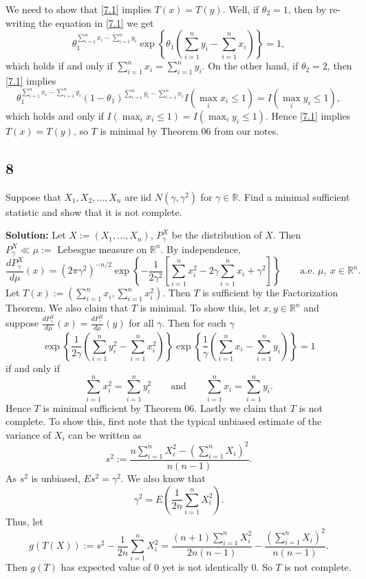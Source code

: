 \documentclass[12pt]{article}
\begin{document}
We need to show that \eqref{7.1} implies $T(x) = T(y)$. 
Well, if $\theta_2 = 1$, then by re-writing the equation in \eqref{7.1} we get 
\[
  \theta_{1}^{\sum_{i=1}^{n}x_{i} - \sum_{i=1}^{n}y_{i}}\exp\left\{ \theta_1\left(\sum_{i=1}^{n}y_{i} - \sum_{i=1}^{n}x_{i}\right) \right\} = 1,
\]
which holds if and only if $\sum_{i=1}^{n}x_{i} = \sum_{i=1}^{n}y_{i}$. 
On the other hand, if $\theta_2 = 2$, then \eqref{7.1} implies
\[ 
  \theta_{1}^{\sum_{i=1}^{n}x_{i} - \sum_{i=1}^{n}y_{i}}(1 - \theta_{1})^{\sum_{i=1}^{n}y_{i} - \sum_{i=1}^{n}x_{i}}I(\max_{i} x_{i} \leq 1) =
  I(\max_{i}y_{i} \leq 1),
\]
which holds and only if $I(\max_{i}x_{i} \leq 1) = I(\max_{i}y_{i} \leq 1)$. Hence \eqref{7.1} implies $T(x) = T(y)$, so $T$ is minimal by Theorem 06 from our notes.


\newpage
\subsection*{8}
\begin{tcolorbox}
  Suppose that $X_1,X_2,\ldots,X_n$ are iid $N(\gamma,\gamma^2)$ for $\gamma\in\mathbb{R}$.  Find a minimal sufficient statistic and show that it is not complete.
\end{tcolorbox}

{\bf Solution:}
Let $X := (X_{1}, \dots, X_{n})$, $P_{\gamma}^{X}$ be the distribution of $X$. Then $P_{\gamma}^{X} \ll \mu :=$ Lebesgue measure on $\mathbb{R}^n$.
By independence,
\[ 
  \frac{dP_{\gamma}^{X}}{d\mu}(x) = \left( 2\pi\gamma^{2} \right)^{-n/2}\exp\left\{ -\frac{1}{2\gamma^{2}}\left[ \sum_{i=1}^{n}x_{i}^{2} -
  2\gamma\sum_{i=1}^{n}x_{i} + \gamma^{2} \right] \right\} \qquad \text{a.e. } \mu, \ x \in \mathbb{R}^{n}.
\]
Let $T(x) := (\sum_{i=1}^{n}x_i, \sum_{i=1}^{n}x_{i}^{2})$. Then $T$ is sufficient by the Factorization Theorem. We also claim that $T$ is minimal.
To show this, let $x, y \in \mathbb{R}^{n}$ and suppose $\frac{dP_{\gamma}^{X}}{d\mu}(x) = \frac{dP_{\gamma}^{X}}{d\mu}(y)$ for all $\gamma$.
Then for each $\gamma$
\[
  \exp\left\{ \frac{1}{2\gamma}\left( \sum_{i=1}^{n}y_{i}^{2} - \sum_{i=1}^{n}x_{i}^{2} \right) \right\}\exp\left\{ \frac{1}{\gamma}\left( 
  \sum_{i=1}^{n}x_{i} - \sum_{i=1}^{n}y_{i}\right) \right\} = 1
\]
if and only if 
\[
  \sum_{i=1}^{n}x_{i}^{2} = \sum_{i=1}^{n}y_{i}^{2} \qquad \text{and} \qquad \sum_{i=1}^{n}x_{i} = \sum_{i=1}^{n}y_{i}.
\]
Hence $T$ is minimal sufficient by Theorem 06. Lastly we claim that $T$ is not complete. To show this, first note that the typical unbiased estimate
of the variance of $X_{i}$ can be written as
\[
  s^{2} := \frac{n\sum_{i=1}^{n}X_{i}^{2} - \left( \sum_{i=1}^{n}X_{i} \right)^{2}}{n(n-1)}.
\]
As $s^{2}$ is unbiased, $Es^{2} = \gamma^{2}$. We also know that 
\[
  \gamma^{2} = E\left( \frac{1}{2n}\sum_{i=1}^{n}X_{i}^{2} \right).
\]
Thus, let 
\[
  g(T(X)) := s^{2} - \frac{1}{2n}\sum_{i=1}^{n}X_{i}^{2} = \frac{(n+1)\sum_{i=1}^{n}X_{i}^{2}}{2n(n-1)} - \frac{\left( \sum_{i=1}^{n}X_{i}
  \right)^{2}}{n(n-1)}.
\]
Then $g(T)$ has expected value of 0 yet is not identically 0. So $T$ is not complete.
\end{document}
